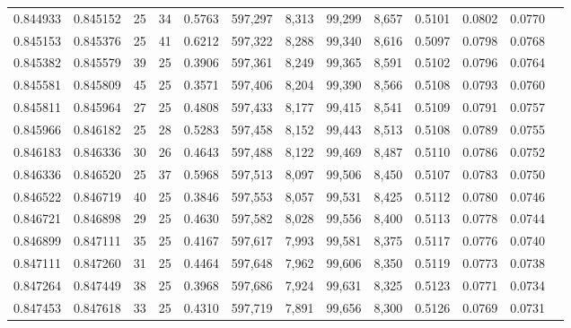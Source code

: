 \begin{tabular}{rrrrrrrrrrrrr}
0.844933 & 0.845152 &    25 &  34 &                                     0.5763 & 597,297 &   8,313 &  99,299 &   8,657 & 0.5101 & 0.0802 & 0.0770 \\
0.845153 & 0.845376 &    25 &  41 &                                     0.6212 & 597,322 &   8,288 &  99,340 &   8,616 & 0.5097 & 0.0798 & 0.0768 \\
0.845382 & 0.845579 &    39 &  25 &                                     0.3906 & 597,361 &   8,249 &  99,365 &   8,591 & 0.5102 & 0.0796 & 0.0764 \\
0.845581 & 0.845809 &    45 &  25 &                                     0.3571 & 597,406 &   8,204 &  99,390 &   8,566 & 0.5108 & 0.0793 & 0.0760 \\
0.845811 & 0.845964 &    27 &  25 &                                     0.4808 & 597,433 &   8,177 &  99,415 &   8,541 & 0.5109 & 0.0791 & 0.0757 \\
0.845966 & 0.846182 &    25 &  28 &                                     0.5283 & 597,458 &   8,152 &  99,443 &   8,513 & 0.5108 & 0.0789 & 0.0755 \\
0.846183 & 0.846336 &    30 &  26 &                                     0.4643 & 597,488 &   8,122 &  99,469 &   8,487 & 0.5110 & 0.0786 & 0.0752 \\
0.846336 & 0.846520 &    25 &  37 &                                     0.5968 & 597,513 &   8,097 &  99,506 &   8,450 & 0.5107 & 0.0783 & 0.0750 \\
0.846522 & 0.846719 &    40 &  25 &                                     0.3846 & 597,553 &   8,057 &  99,531 &   8,425 & 0.5112 & 0.0780 & 0.0746 \\
0.846721 & 0.846898 &    29 &  25 &                                     0.4630 & 597,582 &   8,028 &  99,556 &   8,400 & 0.5113 & 0.0778 & 0.0744 \\
0.846899 & 0.847111 &    35 &  25 &                                     0.4167 & 597,617 &   7,993 &  99,581 &   8,375 & 0.5117 & 0.0776 & 0.0740 \\
0.847111 & 0.847260 &    31 &  25 &                                     0.4464 & 597,648 &   7,962 &  99,606 &   8,350 & 0.5119 & 0.0773 & 0.0738 \\
0.847264 & 0.847449 &    38 &  25 &                                     0.3968 & 597,686 &   7,924 &  99,631 &   8,325 & 0.5123 & 0.0771 & 0.0734 \\
0.847453 & 0.847618 &    33 &  25 &                                     0.4310 & 597,719 &   7,891 &  99,656 &   8,300 & 0.5126 & 0.0769 & 0.0731 \\

\end{tabular}
